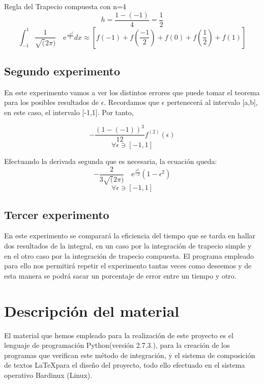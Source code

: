  Regla del Trapecio compuesta con n=4
\[
h=\frac{1-(-1)}{4} =\frac{1}{2} 
\]
\[
\int_{-1}^{1} \frac{1}{\sqrt(2\pi)} \quad\text{e}^{\frac{-x^2}{2}}dx\approx\left[f(-1) + f(\frac{-1}{2}) + f(0) + f(\frac{1}{2}) + f(1)\right]
\]


\subsection{Segundo experimento}
En este experimento vamos a ver los distintos errores que puede tomar el teorema para los posibles resultados de $\epsilon$.
Recordamos que $\epsilon$ pertenecerá al intervalo [a,b], en este caso, el intervalo [-1,1].
Por tanto,

\[
-\frac{\left(1-(-1)\right)^3}{12}  \displaystyle f^{(2)}(\epsilon)
\]
\[
\forall \epsilon \owns [-1,1]
\]


Efectuando la derivada segunda que es necesaria, la ecuación queda:
\[
-\frac{2}{3\sqrt(2\pi)} \quad\text{e}^{\frac{\epsilon^2}{-2}}  \displaystyle  (1-\epsilon^2)
\]
\[
\forall \epsilon \owns [-1,1]
\]



\subsection{Tercer experimento}
En este experimento se comparará la eficiencia del tiempo que se tarda en hallar dos resultados de la integral, en un caso
 por la integración de trapecio simple y en el otro caso por la integración de trapecio compuesta. El programa empleado para
ello nos permitirá repetir el experimento tantas veces como deseemos y de esta manera se podrá sacar un porcentaje de error entre un tiempo 
y otro.



\section{Descripción del material}
\label{3:sec:2}

El material que hemos empleado para la realización de este proyecto es el lenguaje de
programación Python(versión 2.7.3.), para la creación de los programas que verifican este método de integración, 
y el sistema de composición de textos \LaTeX para el diseño del proyecto, todo ello efectuado en el sistema operativo
Bardinux (Linux).


